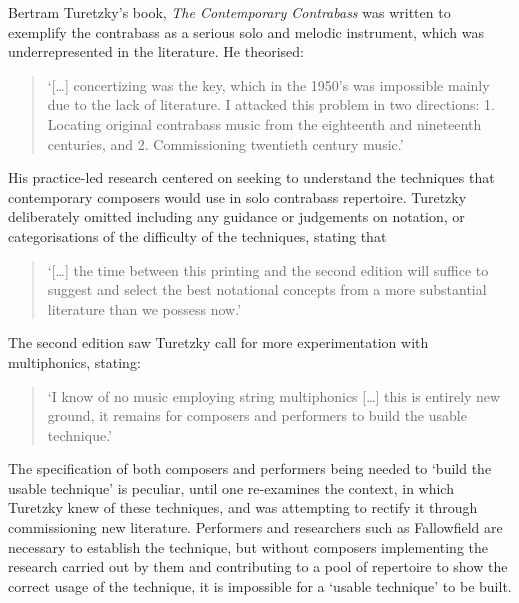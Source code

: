 Bertram Turetzky’s book, \emph{The Contemporary Contrabass} was written to exemplify the contrabass as a serious solo and melodic instrument, which was underrepresented in the literature.\autocite[]{turetzkyContemporaryContrabass1974} He theorised: 
\begin{quote}
    ‘[…] concertizing was the key, which in the 1950’s was impossible mainly due to the lack of literature. I attacked this problem in two directions: 1. Locating original contrabass music from the eighteenth and nineteenth centuries, and 2. Commissioning twentieth century music.’\autocite[vii]{turetzkyContemporaryContrabass1974}
\end{quote}
His practice-led research centered on seeking to understand the techniques that contemporary composers would use in solo contrabass repertoire. 
Turetzky deliberately omitted including any guidance or judgements on notation, or categorisations of the difficulty of the techniques, stating that \begin{quote}
    ‘[…] the time between this printing and the second edition will suffice to suggest and select the best notational concepts from a more substantial literature than we possess now.’\autocite{turetzkyContemporaryContrabass1974} 
\end{quote}The second edition saw Turetzky call for more experimentation with multiphonics, stating:
\begin{quote}
    ‘I know of no music employing string multiphonics […] this is entirely new ground, it remains for composers and performers to build the usable technique.’\autocite[138]{turetzkyContemporaryContrabass1992}
\end{quote}
The specification of both composers and performers being needed to ‘build the usable technique’ is peculiar, until one re-examines the context, in which Turetzky knew of these techniques, and was attempting to rectify it through commissioning new literature. 
Performers and researchers such as Fallowfield are necessary to establish the technique, but without composers implementing the research carried out by them and contributing to a pool of repertoire to show the correct usage of the technique, it is impossible for a ‘usable technique’ to be built.

